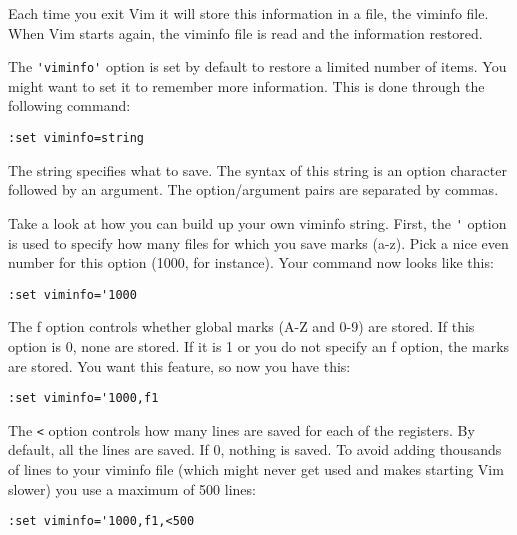 Each time you exit Vim it will store this information in a file, the viminfo file.
When Vim starts again, the viminfo file is read and the information restored.

The \verb!'viminfo'! option is set by default to restore a limited number of items.
You might want to set it to remember more information.
This is done through the following command:

\begin{Verbatim}[samepage=true]
 :set viminfo=string
\end{Verbatim}

The string specifies what to save.
The syntax of this string is an option character followed by an argument.
The option/argument pairs are separated by commas.

Take a look at how you can build up your own viminfo string.
First, the \verb!'! option is used to specify how many files for which you save marks (a-z).
Pick a nice even number for this option (1000, for instance).
Your command now looks like this:

\begin{Verbatim}[samepage=true]
 :set viminfo='1000
\end{Verbatim}

The f option controls whether global marks (A-Z and 0-9) are stored.
If this option is 0, none are stored.
If it is 1 or you do not specify an f option, the marks are stored.
You want this feature, so now you have this:

\begin{Verbatim}[samepage=true]
 :set viminfo='1000,f1
\end{Verbatim}

The \verb!<! option controls how many lines are saved for each of the registers.
By default, all the lines are saved.
If 0, nothing is saved.
To avoid adding thousands of lines to your viminfo file (which might never get used and makes starting Vim slower) you use a maximum of 500 lines:

\begin{Verbatim}[samepage=true]
 :set viminfo='1000,f1,<500
\end{Verbatim}
 
